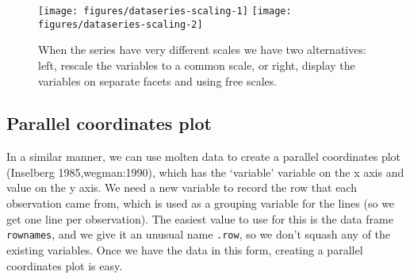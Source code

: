 \begin{Shaded}
\begin{Highlighting}[]
\StringTok{ }
  \StringTok{ } \NormalTok{)}
  \StringTok{ }\NormalTok{rng[}\NormalTok{]) /}\StringTok{ }
\NormalTok{\}}
\StringTok{ } 
  \NormalTok{, }
    
  \NormalTok{) +}\StringTok{ }
\StringTok{  }\StringTok{ } \NormalTok{)}
\end{Highlighting}
\end{Shaded}

\begin{figure}

{\centering \texttt{[image: figures/dataseries-scaling-1]} \texttt{[image: figures/dataseries-scaling-2]} 

}

\caption{When the series have very different scales we have two alternatives: left, rescale the variables to a common scale, or right, display the variables on separate facets and using free scales.\label{fig:series-scaling}}
\end{figure}

\subsection{Parallel coordinates plot}\label{sub:molten-data}

In a similar manner, we can use molten data to create a parallel
coordinates plot (Inselberg 1985,wegman:1990), which has the `variable'
variable on the x axis and value on the y axis. We need a new variable
to record the row that each observation came from, which is used as a
grouping variable for the lines (so we get one line per observation).
The easiest value to use for this is the data frame \texttt{rownames},
and we give it an unusual name \texttt{.row}, so we don't squash any of
the existing variables. Once we have the data in this form, creating a
parallel coordinates plot is easy. 

